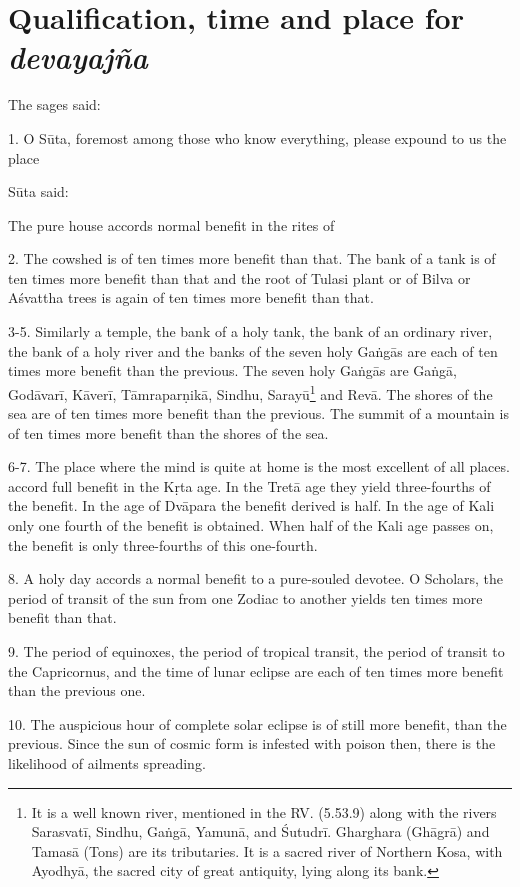 \chapter{Qualification, time and place for \emph{devayajña}}

The sages said:

1. O Sūta, foremost among those who know everything, please expound to us
the place \etc

Sūta said:

The pure house accords normal benefit in the rites of  \etc

2. The cowshed is of ten times more benefit than that. The bank of a tank is of
ten times more benefit than that and the root of Tulasi plant or of Bilva or
Aśvattha trees is again of ten times more benefit than that.

3-5. Similarly a temple, the bank of a holy tank, the bank of an ordinary river,
the bank of a holy river and the banks of the seven holy Gaṅgās are each of ten
times more benefit than the previous. The seven holy Gaṅgās are Gaṅgā, Godāvarī,
Kāverī, Tāmraparṇikā, Sindhu, Sarayū\footnote{It is a well known river,
mentioned in the RV. (5.53.9) along with the rivers Sarasvatī, Sindhu, Gaṅgā,
Yamunā, and Śutudrī. Gharghara (Ghāgrā) and Tamasā (Tons) are its tributaries.
It is a sacred river of Northern Kosa, with Ayodhyā, the sacred city of great
antiquity, lying along its bank.} and Revā. The shores of the sea are of ten
times more benefit than the previous. The summit of a mountain is of ten times
more benefit than the shores of the sea.

6-7. The place where the mind is quite at home is the most excellent of all
places.  \etc accord full benefit in the Kṛta age. In the Tretā
age they yield three-fourths of the benefit. In the age of Dvāpara the benefit
derived is half. In the age of Kali only one fourth of the benefit is obtained.
When half of the Kali age passes on, the benefit is only three-fourths of this
one-fourth.

8. A holy day accords a normal benefit to a pure-souled devotee. O Scholars,
the period of transit of the sun from one Zodiac to another yields ten times
more benefit than that.

9. The period of equinoxes, the period of tropical transit, the period of
transit to the Capricornus, and the time of lunar eclipse are each of ten times
more benefit than the previous one.

10. The auspicious hour of complete solar eclipse is of still more benefit, than
the previous. Since the sun of cosmic form is infested with poison then, there
is the likelihood of ailments spreading.

